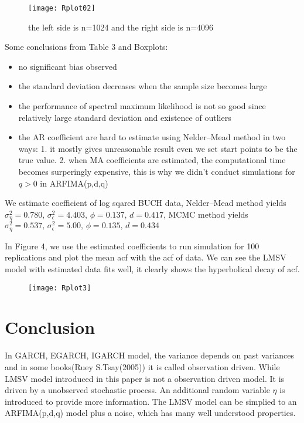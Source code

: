 \documentclass[10pt,a4paper]{article}
\begin{document}
\begin{figure}[!htb]
\centering
\texttt{[image: Rplot02]}
\caption{the left side is n=1024 and the right side is n=4096}
\end{figure}
Some conclusions from Table 3 and Boxplots:
\begin{itemize}
\item {no significant bias observed }
\item {the standard deviation decreases when the sample size becomes large}
\item {the performance of spectral maximum likelihood is not so good since relatively large standard deviation and existence of outliers }
\item {the AR coefficient are hard to estimate using Nelder–Mead method in two ways: 1. it mostly gives unreasonable result even we set start points to be the true value. 2. when MA coefficients are estimated, the computational time becomes surperingly expensive, this is why we didn't conduct simulations for $q>0$ in ARFIMA(p,d,q)}
\end{itemize}

We estimate coefficient of log sqared BUCH data, Nelder–Mead method yields $\sigma_\eta^2=0.780,\, \sigma_\epsilon^2=4.403,\,\phi= 0.137,\,d=0.417$, MCMC method yields $ \sigma_\eta^2=0.537,\, \sigma_\epsilon^2=5.00,\,\phi= 0.135,\,d=0.434 $ 

In Figure 4, we use the estimated coefficients to run simulation for 100 replications and plot the mean acf with the acf of data. We can see the LMSV model with estimated data fits well, it clearly shows the hyperbolical decay of acf.
\begin{figure}[!htb]
\centering
\texttt{[image: Rplot3]}
\caption{}
\end{figure}


\section{Conclusion}
In GARCH, EGARCH, IGARCH model, the variance depends on past variances and  in some books(Ruey S.Tsay(2005))\cite{tsay2005analysis} it is called observation driven. While LMSV model introduced in this paper is not a observation driven model. It is driven by a unobserved stochastic process. An additional random variable $\eta$ is introduced to provide more information. The LMSV model can be simplied to an ARFIMA(p,d,q) model plus a noise, which has many well understood properties.
\end{document}
